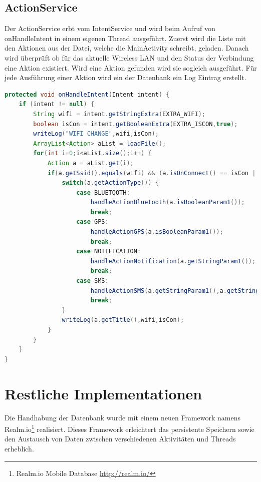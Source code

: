 \subsection{ActionService}
Der ActionService erbt vom IntentService und wird beim Aufruf von onHandleIntent in einem eigenen Thread ausgeführt. Zuerst wird die Liste mit den Aktionen aus der Datei, welche die MainActivity schreibt, geladen. Danach wird überprüft ob für das aktuelle Wireless LAN und den Status der Verbindung eine Aktion existiert. Wird eine Aktion gefunden wird sie sogleich ausgeführt. Für jede Ausführung einer Aktion wird ein der Datenbank ein Log Eintrag erstellt. \\
\begin{lstlisting}[language=Java]
protected void onHandleIntent(Intent intent) {
    if (intent != null) {
        String wifi = intent.getStringExtra(EXTRA_WIFI);
        boolean isCon = intent.getBooleanExtra(EXTRA_ISCON,true);
        writeLog("WIFI CHANGE",wifi,isCon);
        ArrayList<Action> aList = loadFile();
        for(int i=0;i<aList.size();i++) {
            Action a = aList.get(i);
            if(a.getSsid().equals(wifi) && (a.isOnConnect() == isCon || a.isOnLeave() != isCon)) {
                switch(a.getActionType()) {
                    case BLUETOOTH:
                        handleActionBluetooth(a.isBooleanParam1());
                        break;
                    case GPS:
                        handleActionGPS(a.isBooleanParam1());
                        break;
                    case NOTIFICATION:
                        handleActionNotification(a.getStringParam1());
                        break;
                    case SMS:
                        handleActionSMS(a.getStringParam1(),a.getStringParam2());
                        break;
                }
                writeLog(a.getTitle(),wifi,isCon);
            }
        }
    }
}
\end{lstlisting}

\section{Restliche Implementationen}
Die Handhabung der Datenbank wurde mit einem neuen Framework namens Realm.io\footnote{Realm.io Mobile Database \url{http://realm.io/}} realisiert. Dieses Framework erleichtert das persistente Speichern sowie den Austausch von Daten zwischen verschiedenen Aktivitäten und Threads erheblich.